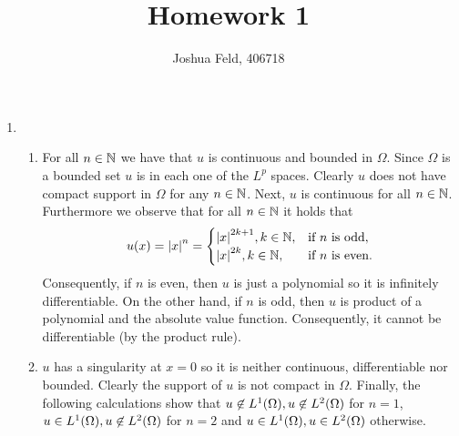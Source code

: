 \documentclass[english]{exercise}
\title{Homework 1}
\author{Joshua Feld, 406718}
\begin{document}
	\maketitle


	\section{}

	\begin{enumerate}
		\item
		\begin{enumerate}
			\item For all \(n \in \mathbb{N}\) we have that \(u\) is continuous and bounded in \(\Omega\).
			Since \(\Omega\) is a bounded set \(u\) is in each one of the \(L^p\) spaces.
			Clearly \(u\) does not have compact support in \(\Omega\) for any \(n \in \mathbb{N}\).
			Next, \(u\) is continuous for all \(n \in \mathbb{N}\).
			Furthermore we observe that for all \(n \in \mathbb{N}\) it holds that
			\[
				u\parentheses*{x} = \absolute*{x}^n = \begin{cases}
					\absolute*{x}^{2k + 1}, k \in \N, & \text{if }n\text{ is odd},\\
					\absolute*{x}^{2k}, k \in \N, & \text{if }n\text{ is even}.
				\end{cases}
			\]
			Consequently, if \(n\) is even, then \(u\) is just a polynomial so it is infinitely differentiable.
			On the other hand, if \(n\) is odd, then \(u\) is product of a polynomial and the absolute value function.
			Consequently, it cannot be differentiable (by the product rule).
			\item \(u\) has a singularity at \(x = 0\) so it is neither continuous, differentiable nor bounded.
			Clearly the support of \(u\) is not compact in \(\Omega\).
			Finally, the following calculations show that \(u \not\in L^1\parentheses*{\Omega}, u \not\in L^2\parentheses*{\Omega}\) for \(n = 1\), \(u \in L^1\parentheses*{\Omega}, u \not\in L^2\parentheses*{\Omega}\) for \(n = 2\) and \(u \in L^1\parentheses*{\Omega}, u \in L^2\parentheses*{\Omega}\) otherwise.


\end{enumerate}
\end{enumerate}
\end{document}
